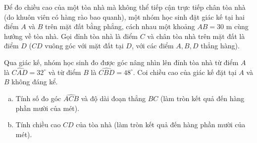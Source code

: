 \begin{ex}
	Để đo chiều cao của một tòa nhà mà không thể tiếp cận trực tiếp chân tòa nhà (do khuôn viên có hàng rào bao quanh), một nhóm học sinh đặt giác kế tại hai điểm $A$ và $B$ trên mặt đất bằng phẳng, cách nhau một khoảng $AB = 30\text{ m}$ cùng hướng về tòa nhà. Gọi đỉnh tòa nhà là điểm $C$ và chân tòa nhà trên mặt đất là điểm $D$ ($CD$ vuông góc với mặt đất tại $D$, với các điểm $A, B, D$ thẳng hàng).
	
	Qua giác kế, nhóm học sinh đo được góc nâng nhìn lên đỉnh tòa nhà từ điểm $A$ là $\widehat{CAD} = 32^\circ$ và từ điểm $B$ là $\widehat{CBD} = 48^\circ$. Coi chiều cao của giác kế đặt tại $A$ và $B$ không đáng kể. 
	\begin{enumerate}[a)]
		\item Tính số đo góc $\widehat{ACB}$ và độ dài đoạn thẳng $BC$ (làm tròn kết quả đến hàng phần mười của mét).
		\item Tính chiều cao $CD$ của tòa nhà (làm tròn kết quả đến hàng phần mười của mét).
	\end{enumerate}
\end{ex}
